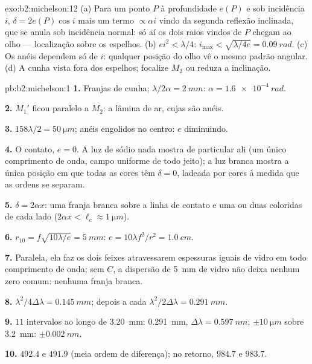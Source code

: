 \begin{solution}{exo:b2:michelson:12}
(a) Para um ponto $P$ à profundidade $e(P)$ e sob incidência $i$, $\delta = 2e(P)\cos i$
mais um termo $\propto\alpha i$ vindo da segunda reflexão inclinada, que se
anula sob incidência normal: só aí os dois raios vindos de $P$ chegam
ao olho --- localização sobre os espelhos. (b) $ei^2 < \lambda/4$: $i_{\max} <
\sqrt{\lambda/4e} = \qty{0.09}{rad}$. (c) Os anéis dependem só de $i$: qualquer posição
do olho vê o mesmo padrão angular. (d) A cunha vista fora dos
espelhos; focalize $M_2$ ou reduza a inclinação.
\end{solution}

\begin{solution}{pb:b2:michelson:1}
\textbf{1.} Franjas de cunha; $\lambda/2\alpha = \qty{2}{mm}$: $\alpha = \qty{1.6e-4}{rad}$.

\textbf{2.} $M_1'$ ficou paralelo a $M_2$: a lâmina de ar, cujas
 são anéis.

\textbf{3.} $158\lambda/2 = \qty{50}{\micro m}$; anéis engolidos no centro: $e$
diminuindo.

\textbf{4.} O contato, $e = 0$. A luz de sódio nada mostra de particular ali (um
único comprimento de onda, campo uniforme de todo jeito); a luz branca mostra a única
posição em que todas as cores têm $\delta = 0$, ladeada por cores à medida que as
ordens se separam.

\textbf{5.} $\delta = 2\alpha x$: uma franja branca sobre a linha de contato e uma ou
duas coloridas de cada lado ($2\alpha x < \ell_c \approx \qty{1}{\micro m}$).

\textbf{6.} $r_{10} = f\sqrt{10\lambda/e} = \qty{5}{mm}$: $e = 10\lambda f^2/r^2 = \qty{1.0}{cm}$.

\textbf{7.} Paralela, ela faz os dois feixes atravessarem espessuras iguais de vidro em todo
comprimento de onda; sem $C$, a dispersão de \qty{5}{mm} de vidro não deixa
nenhum zero comum: nenhuma franja branca.

\textbf{8.} $\lambda^2/4\Delta\lambda = \qty{0.145}{mm}$; depois a cada $\lambda^2/2\Delta\lambda = \qty{0.291}{mm}$.

\textbf{9.} $11$ intervalos ao longo de \qty{3.20}{mm}: \qty{0.291}{mm}, $\Delta\lambda = \qty{0.597}{nm}$;
$\pm\qty{10}{\micro m}$ sobre \qty{3.2}{mm}: $\pm\qty{0.002}{nm}$.

\textbf{10.} $492.4$ e $491.9$ (meia ordem de diferença); no retorno,
$984.7$ e $983.7$.


\end{solution}
